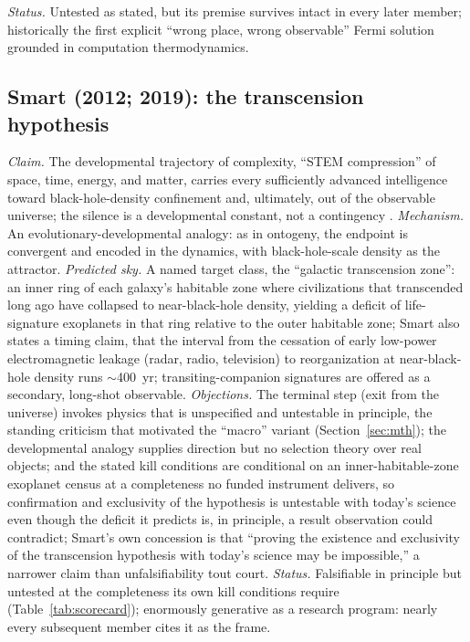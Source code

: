 \documentclass[11pt]{article}
\begin{document}
\emph{Status.} Untested as stated, but its premise survives intact in every later member; historically the first explicit ``wrong place, wrong observable'' Fermi solution grounded in computation thermodynamics.

\subsection{Smart (2012; 2019): the transcension hypothesis}

\emph{Claim.} The developmental trajectory of complexity, ``STEM compression'' of space, time, energy, and matter, carries every sufficiently advanced intelligence toward black-hole-density confinement and, ultimately, out of the observable universe; the silence is a developmental constant, not a contingency \citep{Smart2012,Smart2019}.
\emph{Mechanism.} An evolutionary-developmental analogy: as in ontogeny, the endpoint is convergent and encoded in the dynamics, with black-hole-scale density as the attractor.
\emph{Predicted sky.} A named target class, the ``galactic transcension zone'': an inner ring of each galaxy's habitable zone where civilizations that transcended long ago have collapsed to near-black-hole density, yielding a deficit of life-signature exoplanets in that ring relative to the outer habitable zone; Smart also states a timing claim, that the interval from the cessation of early low-power electromagnetic leakage (radar, radio, television) to reorganization at near-black-hole density runs $\sim$400~yr; transiting-companion signatures are offered as a secondary, long-shot observable.
\emph{Objections.} The terminal step (exit from the universe) invokes physics that is unspecified and untestable in principle, the standing criticism that motivated the ``macro'' variant (Section~\ref{sec:mth}); the developmental analogy supplies direction but no selection theory over real objects; and the stated kill conditions are conditional on an inner-habitable-zone exoplanet census at a completeness no funded instrument delivers, so confirmation and exclusivity of the hypothesis is untestable with today's science even though the deficit it predicts is, in principle, a result observation could contradict; Smart's own concession is that ``proving the existence and exclusivity of the transcension hypothesis with today's science may be impossible,'' a narrower claim than unfalsifiability tout court.
\emph{Status.} Falsifiable in principle but untested at the completeness its own kill conditions require (Table~\ref{tab:scorecard}); enormously generative as a research program: nearly every subsequent member cites it as the frame.
\end{document}
